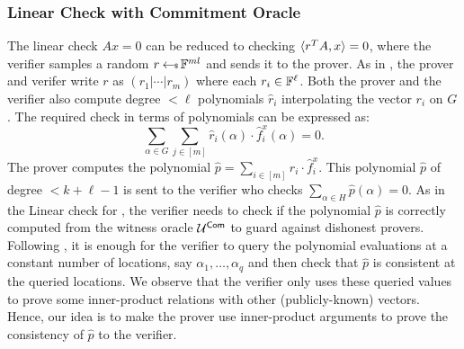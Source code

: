 \subsubsection{Linear Check with Commitment Oracle}\label{sec:lincheck2D}
The linear check $Ax=0$ can be reduced to checking
$\langle r^TA,x\rangle=0$, where the verifier samples a random $r\hskip2.3pt{\gets\!\!\mbox{\tiny${\$}$\normalsize}}\, \mathbb{F}^{ml}$
and sends it to the prover. As in \cite{ligero}, the prover and verifer write $r$ as
$(r_{1}|\cdots|r_{m})$ where each $r_i\in \mathbb{F}^\ell$. Both the prover and the
verifier also compute degree $<\ell$ polynomials $\hat{r}_{i}$ interpolating
the vector $r_{i}$ on $G$. The required check in terms of polynomials can be
expressed as:
\begin{equation}\label{eq:lincheck2D}
\sum_{\alpha\in G}\sum_{j\in [m]}
\hat{r}_{i}(\alpha) \cdot \hat{f}^x_{i}(\alpha) = 0.
\end{equation}
The prover computes the polynomial $\hat{p}=\sum_{i\in[m]}\hat{r}_i \cdot \hat{f}^x_i$. 
This polynomial $\hat{p}$ of degree $< k+\ell-1$ is sent to the verifier who checks
$\sum_{\alpha\in H}\hat{p}(\alpha)=0$. 
As in the Linear check for \cite{ligero}, the verifier needs to check if
the polynomial $\hat{p}$ is correctly computed from the witness oracle $\mathcal{U}^{\mathsf{Com}}$
to guard against dishonest provers.
Following \cite{ligero}, it is enough for the verifier to query the polynomial evaluations at a constant
number of locations, say $\alpha_1,\ldots,\alpha_q$ and then check
that $\hat{p}$ is consistent at the queried locations. We observe that the verifier only
uses these queried values to prove some inner-product relations with other 
(publicly-known) vectors. Hence, our idea is to make the prover 
use inner-product arguments to prove the consistency of $\hat{p}$ to the verifier.

